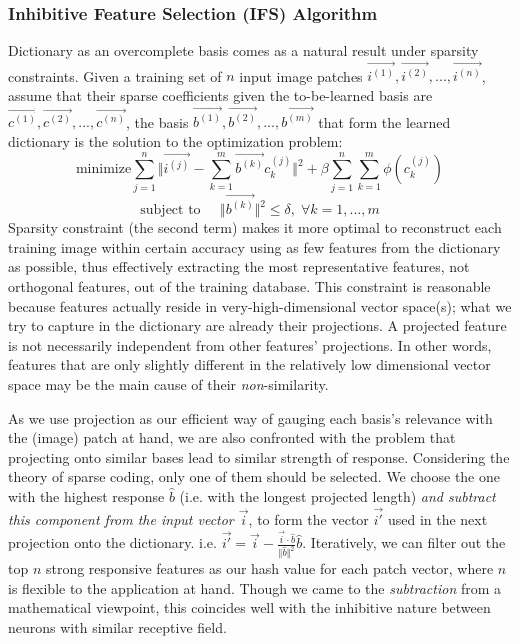 \documentclass[letterpaper]{article}
\begin{document}
\subsubsection{Inhibitive Feature Selection (IFS) Algorithm}
Dictionary as an overcomplete basis comes as a natural result under sparsity constraints. Given a training set of $n$ input image patches $\overrightarrow{i^{(1)}},\overrightarrow{i^{(2)}},...,\overrightarrow{i^{(n)}}$, assume that their sparse coefficients given the to-be-learned basis are $\overrightarrow{c^{(1)}},\overrightarrow{c^{(2)}},...,\overrightarrow{c^{(n)}}$, the basis $\overrightarrow{b^{(1)}},\overrightarrow{b^{(2)}},...,\overrightarrow{b^{(m)}}$ that form the learned dictionary is the solution to the optimization problem:
\[\mbox{minimize}\sum_{j=1}^{n}\Vert \overrightarrow{i^{(j)}}-\sum_{k=1}^{m}\overrightarrow{b^{(k)}}c_k^{(j)}\Vert^2 + \beta \sum_{j=1}^{n}\sum_{k=1}^{m}\phi(c_k^{(j)})\]
\[\mbox{subject to}\;\;\;\;\; \Vert\overrightarrow{b^{(k)}}\Vert^2 \leq \delta,\; \forall k=1,...,m\]
Sparsity constraint (the second term) makes it more optimal to reconstruct each training image within certain accuracy using as few features from the dictionary as possible, thus effectively extracting the most representative features, not orthogonal features, out of the training database. This constraint is reasonable because features actually reside in very-high-dimensional vector space(s); what we try to capture in the dictionary are already their projections. A projected feature is not necessarily independent from other features' projections. In other words, features that are only slightly different in the relatively low dimensional vector space may be the main cause of their \emph{non}-similarity.

As we use projection as our efficient way of gauging each basis's relevance with the (image) patch at hand, we are also confronted with the problem that projecting onto similar bases lead to similar strength of response. Considering the theory of sparse coding, only one of them should be selected. We choose the one with the highest response $\widehat{b}$ (i.e. with the longest projected length) \emph{and subtract this component from the input vector $\overrightarrow{i}$}, to form the vector $\overrightarrow{i'}$ used in the next projection onto the dictionary. i.e. $\overrightarrow{i'}=\overrightarrow{i}-\frac{\overrightarrow{i}\cdot\widehat{b}}{\Vert \widehat{b} \Vert ^{2}}\widehat{b}$. Iteratively, we can filter out the top $n$ strong responsive features as our hash value for each patch vector, where $n$ is flexible to the application at hand. Though we came to the \emph{subtraction} from a mathematical viewpoint, this coincides well with the inhibitive nature between neurons with similar receptive field.
\end{document}
